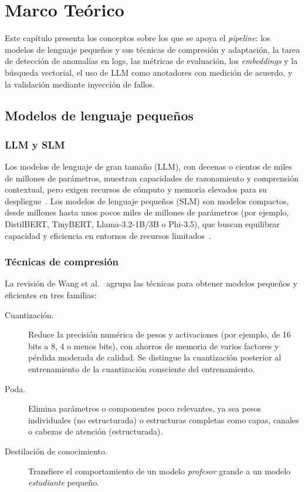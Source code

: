 \chapter{Marco Teórico} \label{cap:marco_teorico}

Este capítulo presenta los conceptos sobre los que se apoya el \textit{pipeline}: los modelos de lenguaje pequeños y sus técnicas de compresión y adaptación, la tarea de detección de anomalías en logs, las métricas de evaluación, los \textit{embeddings} y la búsqueda vectorial, el uso de LLM como anotadores con medición de acuerdo, y la validación mediante inyección de fallos.

\section{Modelos de lenguaje pequeños}\label{sec:mt_slm}

\subsection{LLM y SLM}

Los modelos de lenguaje de gran tamaño (LLM), con decenas o cientos de miles de millones de parámetros, muestran capacidades de razonamiento y comprensión contextual, pero exigen recursos de cómputo y memoria elevados para su despliegue~\cite{wang2025_slm_survey, chen2025_collab_survey}. Los modelos de lenguaje pequeños (SLM) son modelos compactos, desde millones hasta unos pocos miles de millones de parámetros (por ejemplo, DistilBERT, TinyBERT, Llama-3.2-1B/3B o Phi-3.5), que buscan equilibrar capacidad y eficiencia en entornos de recursos limitados~\cite{wang2025_slm_survey, saha2025_slm_minimal}.

\subsection{Técnicas de compresión}\label{subsec:mt_compresion}

La revisión de Wang et al.~\cite{wang2025_slm_survey} agrupa las técnicas para obtener modelos pequeños y eficientes en tres familias:

\begin{description}
  \item[Cuantización.] Reduce la precisión numérica de pesos y activaciones (por ejemplo, de 16 bits a 8, 4 o menos bits), con ahorros de memoria de varios factores y pérdida moderada de calidad. Se distingue la cuantización posterior al entrenamiento de la cuantización consciente del entrenamiento.
  \item[Poda.] Elimina parámetros o componentes poco relevantes, ya sea pesos individuales (no estructurada) o estructuras completas como capas, canales o cabezas de atención (estructurada).
  \item[Destilación de conocimiento.] Transfiere el comportamiento de un modelo \textit{profesor} grande a un modelo \textit{estudiante} pequeño.
\end{description}

